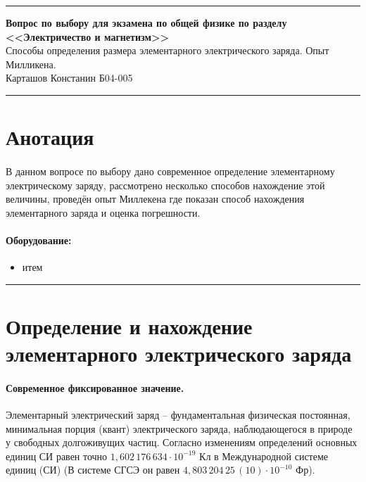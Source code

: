 \documentclass[a4paper,12pt]{article} %
\begin{document}


\hrule 	
\medskip
\begin{raggedright}
{\large \textbf{Вопрос по выбору для экзамена по общей физике по разделу <<Электричество и магнетизм>>}}
\\
\medskip
{\Large Способы определения размера элементарного электрического заряда. Опыт Милликена.} 
\\
\medskip
{\large Карташов Констанин Б04-005}
\medskip
\hrule
\medskip
\end{raggedright}


\section{Анотация}

\paragraph{} В данном вопросе по выбору дано современное определение элементарному электрическому заряду, рассмотрено несколько способов нахождение этой величины, проведён опыт Миллекена где показан способ нахождения элементарного заряда и оценка погрешности. 

\paragraph{Оборудование:}
\begin{itemize}
\renewcommand{\labelitemi}{$\triangleright$}
\itemsep0em
\item итем
\end{itemize}


\medskip\hrule\medskip

\section{Определение и нахождение элементарного электрического заряда}

\paragraph{Современное фиксированное значение.} Элементарный электрический заряд -- фундаментальная физическая постоянная, минимальная порция (квант) электрического заряда, наблюдающегося в природе у свободных долгоживущих частиц. Согласно изменениям определений основных единиц СИ равен точно $1,602 \, 176 \, 634 \cdot 10^{-19}$ Кл в Международной системе единиц (СИ) (В системе СГСЭ он равен $4,803\,204\,25\,(10) \cdot 10^{-10}$ Фр).
\end{document}
